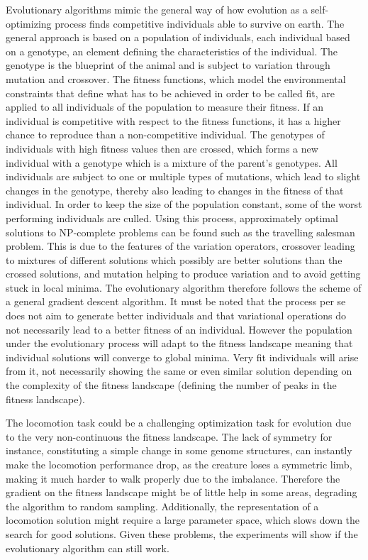 \documentclass[main]{subfiles}
\begin{document}
Evolutionary algorithms mimic the general way of how evolution as a self-optimizing process finds competitive individuals able to survive on earth. %
%
The general approach is based on a population of individuals, each individual based on a genotype, an element defining the characteristics of the individual. %
%
The genotype is the blueprint of the animal and is subject to variation through mutation and crossover. %
%
The fitness functions, which model the environmental constraints that define what has to be achieved in order to be called fit, are applied to all individuals of the population to measure their fitness. %
%
If an individual is competitive with respect to the fitness functions, it has a higher chance to reproduce than a non-competitive individual. %
%
The genotypes of individuals with high fitness values then are crossed, which forms a new individual with a genotype which is a mixture of the parent's genotypes. %
%
All individuals are subject to one or multiple types of mutations, which lead to slight changes in the genotype, thereby also leading to changes in the fitness of that individual. %
%
In order to keep the size of the population constant, some of the worst performing individuals are culled. Using this process, approximately optimal solutions to NP-complete problems can be found such as the travelling salesman problem. %
%
This is due to the features of the variation operators, crossover leading to mixtures of different solutions which possibly are better solutions than the crossed solutions, and mutation helping to produce variation and to avoid getting stuck in local minima. %
%
The evolutionary algorithm therefore follows the scheme of a general gradient descent algorithm. %
%
It must be noted that the process per se does not aim to generate better individuals and that variational operations do not necessarily lead to a better fitness of an individual. %
%
However the population under the evolutionary process will adapt to the fitness landscape meaning that individual solutions will converge to global minima. %
%
Very fit individuals will arise from it, not necessarily showing the same or even similar solution depending on the complexity of the fitness landscape (defining the number of peaks in the fitness landscape). 


The locomotion task could be a challenging optimization task for evolution due to the very non-continuous the fitness landscape. %
%
The lack of symmetry for instance, constituting a simple change in some genome structures, can instantly make the locomotion performance drop, as the creature loses a symmetric limb, making it much harder to walk properly due to the imbalance. %
%
Therefore the gradient on the fitness landscape might be of little help in some areas, degrading the algorithm to random sampling. %
%
Additionally, the representation of a locomotion solution might require a large parameter space, which slows down the search for good solutions. Given these problems, the experiments will show if the evolutionary algorithm can still work.
\end{document}
